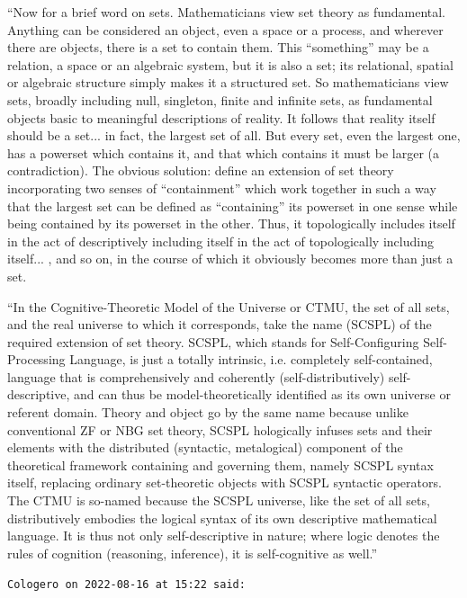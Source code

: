 \begin{footnotesize}
\begin{sffamily}
``Now for a brief word on sets. Mathematicians view set theory as fundamental. Anything can be considered an object, even a space or a process, and wherever there are objects, there is a set to contain them. This ``something'' may be a relation, a space or an algebraic system, but it is also a set; its relational, spatial or algebraic structure simply makes it a structured set. So mathematicians view sets, broadly including null, singleton, finite and infinite sets, as fundamental objects basic to meaningful descriptions of reality. It follows that reality itself should be a set... in fact, the largest set of all. But every set, even the largest one, has a powerset which contains it, and that which contains it must be larger (a contradiction). The obvious solution: define an extension of set theory incorporating two senses of ``containment'' which work together in such a way that the largest set can be defined as ``containing'' its powerset in one sense while being contained by its powerset in the other. Thus, it topologically includes itself in the act of descriptively including itself in the act of topologically including itself... , and so on, in the course of which it obviously becomes more than just a set.

``In the Cognitive-Theoretic Model of the Universe or CTMU, the set of all sets, and the real universe to which it corresponds, take the name (SCSPL) of the required extension of set theory. SCSPL, which stands for Self-Configuring Self-Processing Language, is just a totally intrinsic, i.e. completely self-contained, language that is comprehensively and coherently (self-distributively) self-descriptive, and can thus be model-theoretically identified as its own universe or referent domain. Theory and object go by the same name because unlike conventional ZF or NBG set theory, SCSPL hologically infuses sets and their elements with the distributed (syntactic, metalogical) component of the theoretical framework containing and governing them, namely SCSPL syntax itself, replacing ordinary set-theoretic objects with SCSPL syntactic operators. The CTMU is so-named because the SCSPL universe, like the set of all sets, distributively embodies the logical syntax of its own descriptive mathematical language. It is thus not only self-descriptive in nature; where logic denotes the rules of cognition (reasoning, inference), it is self-cognitive as well.''

\hfill

\texttt{Cologero on 2022-08-16 at 15:22 said:}


\end{sffamily}
\end{footnotesize}
